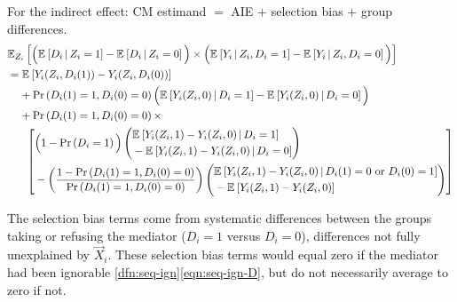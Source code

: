 \noindent
For the indirect effect: CM estimand $=$ AIE $+$ selection bias $+$ group differences.
\begin{align*}
    &\E[Z_i]{
        \Big( \Egiven{D_i}{Z_i = 1} - \Egiven{D_i}{Z_i = 0} \Big) \times
        \Big( \Egiven{Y_i}{Z_i, D_i = 1} - \Egiven{Y_i}{Z_i, D_i = 0} \Big) } \\
    & = \E{Y_i(Z_i, D_i(1)) - Y_i(Z_i, D_i(0))} \\
    & \;\;\;\; + \Prob{D_i(1) = 1, D_i(0) = 0} \Big(
        \Egiven{Y_i(Z_i, 0)}{D_i = 1} - \Egiven{Y_i(Z_i, 0)}{D_i = 0} \Big) \\
    & \;\;\;\; + \Prob{D_i(1) = 1, D_i(0) = 0} \times \\
    & \;\;\;\; \;\; \left[ \begin{aligned}
        &\Big( 1 - \Prob{D_i=1} \Big)
        \left( \begin{aligned}
            &\Egiven{Y_i(Z_i, 1) - Y_i(Z_i, 0)}{D_i = 1} \\ 
            &  - \Egiven{Y_i(Z_i, 1) - Y_i(Z_i, 0)}{D_i = 0}
        \end{aligned} \right) \\
        &- \left( \frac{1 - \Prob{D_i(1) = 1, D_i(0) = 0} }{
            \Prob{D_i(1) = 1, D_i(0) = 0}} \right)
        \left( \begin{aligned}
            &\Egiven{Y_i(Z_i, 1) - Y_i(Z_i, 0)}{D_i(1) = 0 \text{ or } D_i(0)=1} \\ 
            &  - \E{Y_i(Z_i, 1) - Y_i(Z_i, 0)}
        \end{aligned} \right)
    \end{aligned} \right]
\end{align*}

The selection bias terms come from systematic differences between the groups taking or refusing the mediator ($D_i = 1$ versus $D_i = 0$), differences not fully unexplained by $\vec X_i$.
These selection bias terms would equal zero if the mediator had been ignorable \ref{dfn:seq-ign}\eqref{eqn:seq-ign-D}, but do not necessarily average to zero if not.%

